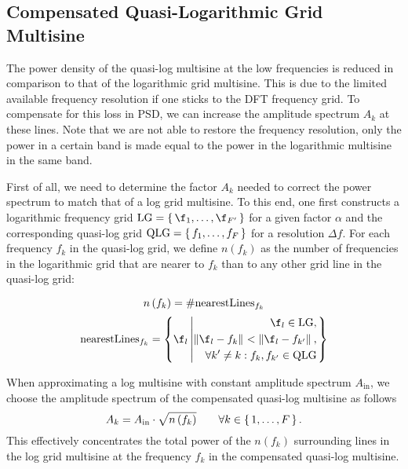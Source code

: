 \subsection{Compensated Quasi-Logarithmic Grid Multisine}
  The power density of the quasi-log multisine at the low frequencies is reduced in comparison to that of the logarithmic grid multisine.
  This is due to the limited available frequency resolution if one sticks to the \gls{DFT} frequency grid.
  To compensate for this loss in \gls{PSD}, we can increase the amplitude spectrum $A_k$ at these lines.
  Note that we are not able to restore the frequency resolution, only the power in a certain band is made equal to the power in the logarithmic multisine in the same band.

  First of all, we need to determine the factor $A_k$ needed to correct the power spectrum to match that of a log grid multisine.
  To this end, one first constructs a logarithmic frequency grid $\LOGGRID = \set{\f_1, \ldots, \f_{F'}}$ for a given factor $\alpha$ and the corresponding quasi-log grid $\mathrm{QLG} = \set{f_1, \ldots, f_F}$ for a resolution $\Delta f$.
  For each frequency $f_k$ in the quasi-log grid, we define $n\left(f_k\right)$ as the number of frequencies in the logarithmic grid that are nearer to $f_k$ than to any other grid line in the quasi-log grid:
  
  \begin{equation}
    n\left(f_k\right) = \# \mathrm{nearestLines}_{f_k}
    \label{eq:excitation:nfk}
  \end{equation}
  \begin{equation}
    \mathrm{nearestLines}_{f_k} =
      \left\{ 
        \f_l \given{\begin{aligned} 
                       \f_l \in \LOGGRID, \\
                       \norm{\f_l - f_k} < \norm{\f_l - f_{k'}},\\
                       \forall k' \neq k: f_k, f_{k'} \in \QLOGGRID
                    \end{aligned}}
      \right\}
    \label{eq:excitation:nearestLines}
  \end{equation}  
  
  When approximating a log multisine with constant amplitude spectrum $A_{\mathrm{in}}$, we choose the amplitude spectrum of the compensated quasi-log multisine as follows
  \begin{equation}
    A_k = A_{\mathrm{in}} \cdot \sqrt{n\left(f_k\right)}\qquad \forall k \in \set{1,\ldots,F}
  \text{.}
  \label{eq:excitation:compensationAk}
  \end{equation}
  This effectively concentrates the total power of the $n\left( f_k \right)$ surrounding lines in the log grid multisine at the frequency $f_k$ in the compensated quasi-log multisine.
  
